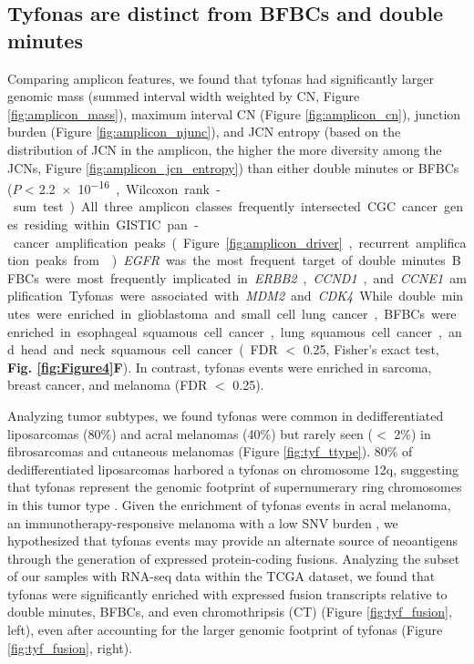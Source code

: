 \documentclass[phd,tocprelim]{cornell}
\begin{document}
\subsection*{Tyfonas are distinct from BFBCs and double minutes}
Comparing amplicon features, we found that tyfonas had significantly larger genomic mass (summed interval width weighted by CN, Figure \ref{fig:amplicon_mass}), maximum interval CN (Figure \ref{fig:amplicon_cn}), junction burden (Figure \ref{fig:amplicon_njunc}), and JCN entropy (based on the distribution of JCN in the amplicon, the higher the more diversity among the JCNs, Figure \ref{fig:amplicon_jcn_entropy}) than either double minutes or BFBCs ($P$ < \SI{2.2e-16}, Wilcoxon rank-sum test).  All three amplicon classes frequently intersected CGC cancer genes residing within GISTIC pan-cancer amplification peaks (Figure \ref{fig:amplicon_driver}, recurrent amplification peaks from \cite{Zack:2013f1f}). \textit{EGFR} was the most frequent target of double minutes.  BFBCs were most frequently implicated in \textit{ERBB2}, \textit{CCND1}, and \textit{CCNE1} amplification. Tyfonas were associated with \textit{MDM2} and \textit{CDK4}. While double minutes were enriched in glioblastoma and small cell lung cancer, BFBCs were enriched in esophageal squamous cell cancer, lung squamous cell cancer, and head and neck squamous cell cancer (FDR $<$ 0.25, Fisher's exact test, \textbf{Fig. \ref{fig:Figure4}F}). In contrast, tyfonas events were enriched in sarcoma, breast cancer, and melanoma (FDR $<$ 0.25).


Analyzing tumor subtypes, we found tyfonas were common in dedifferentiated liposarcomas (80\%) and acral melanomas (40\%) but rarely seen ($<$ 2\%) in fibrosarcomas and cutaneous melanomas (Figure \ref{fig:tyf_ttype}).    80\% of dedifferentiated liposarcomas harbored a tyfonas on chromosome 12q, suggesting that tyfonas represent the genomic footprint of supernumerary ring chromosomes in this tumor type \cite{Reimann2008-tj}. Given the enrichment of tyfonas events in acral melanoma, an immunotherapy-responsive melanoma with a low SNV burden \cite{Shoushtari2016-de}, we hypothesized that tyfonas events may provide an alternate source of neoantigens through the generation of expressed protein-coding fusions.  Analyzing the subset of our samples with RNA-seq data within the TCGA dataset, we found that tyfonas were significantly enriched with expressed fusion transcripts relative to double minutes, BFBCs, and even chromothripsis (CT) (Figure \ref{fig:tyf_fusion}, left), even after accounting for the larger genomic footprint of tyfonas (Figure \ref{fig:tyf_fusion}, right).
\end{document}
